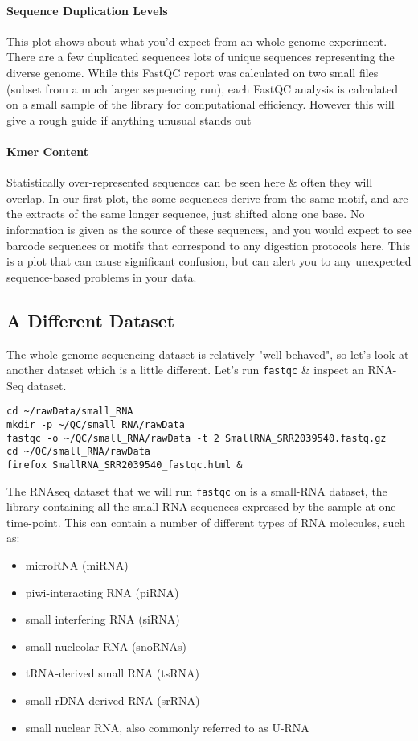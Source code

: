 \paragraph{Sequence Duplication Levels}
This plot shows about what you'd expect from an whole genome experiment.
There are a few duplicated sequences lots of unique sequences representing the diverse genome.
While this FastQC report was calculated on two small files (subset from a much larger sequencing run), each FastQC analysis is calculated on a small sample of the library for computational efficiency. However this will give a rough guide if anything unusual stands out

\paragraph{Kmer Content}
Statistically over-represented sequences can be seen here \& often they will overlap.
In our first plot, the some sequences derive from the same motif, and are the extracts of the same longer sequence, just shifted along one base.
No information is given as the source of these sequences, and you would expect to see barcode sequences or motifs that correspond to any digestion protocols here.
This is a plot that can cause significant confusion, but can alert you to any unexpected sequence-based problems in your data.

\subsection{A Different Dataset}
The whole-genome sequencing dataset is relatively "well-behaved", so let's look at another dataset which is a little different.
Let's run \texttt{fastqc} \& inspect an RNA-Seq dataset.

\begin{lstlisting}
cd ~/rawData/small_RNA
mkdir -p ~/QC/small_RNA/rawData
fastqc -o ~/QC/small_RNA/rawData -t 2 SmallRNA_SRR2039540.fastq.gz
cd ~/QC/small_RNA/rawData
firefox SmallRNA_SRR2039540_fastqc.html &
\end{lstlisting}

The RNAseq dataset that we will run \texttt{fastqc} on is a small-RNA dataset, the library containing all the small RNA sequences expressed by the sample at one time-point. This can contain a number of different types of RNA molecules, such as:
\begin{itemize}
\item microRNA (miRNA)
\item piwi-interacting RNA (piRNA)
\item small interfering RNA (siRNA)
\item small nucleolar RNA (snoRNAs)
\item tRNA-derived small RNA (tsRNA)
\item small rDNA-derived RNA (srRNA)
\item small nuclear RNA, also commonly referred to as U-RNA
\end{itemize}

